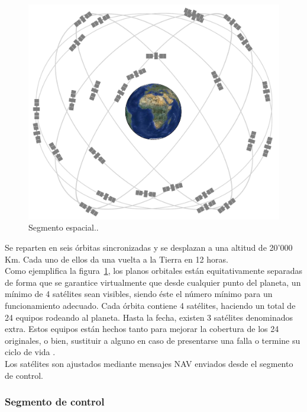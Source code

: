 \begin{figure}[H]
\centering
\includegraphics[scale=0.2]{Figures/constel}
\caption[Segmento espacial.]{Segmento espacial.\footnotemark.}
\label{fig:segEs}
\end{figure}


Se reparten en seis órbitas sincronizadas y se desplazan a una altitud de 20'000 Km. Cada uno de ellos da una vuelta a la Tierra en 12 horas. \\

Como ejemplifica la figura~\ref{fig:segEs}, los planos orbitales están equitativamente separadas de forma que se garantice virtualmente que desde cualquier punto del planeta, un mínimo de 4 satélites sean visibles, siendo éste el número mínimo para un funcionamiento adecuado. Cada órbita contiene 4 satélites, haciendo un total de 24 equipos rodeando al planeta. Hasta la fecha, existen 3 satélites denominados extra. Estos equipos están hechos tanto para mejorar la cobertura de los 24 originales, o bien, sustituir a alguno en caso de presentarse una falla o termine su ciclo de vida \citep{gps_gov}.\\

Los satélites son ajustados mediante mensajes NAV enviados desde el segmento de control.

\subsubsection{Segmento de control}

